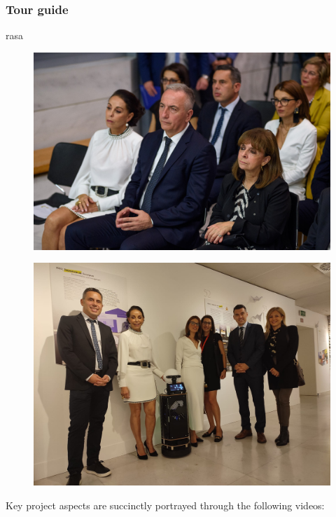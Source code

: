 \subsubsection{Tour guide}
rasa





\begin{figure}[H]\centering
  \includegraphics[scale=0.35]{images/cultureid/omg1.jpg}
  \caption{\small }
  \label{fig:cultureid_omg1}
\end{figure}
\begin{figure}[H]\centering
  \includegraphics[scale=0.2]{images/cultureid/omg2.jpg}
  \caption{\small }
  \label{fig:cultureid_omg2}
\end{figure}

\noindent Key project aspects are succinctly portrayed through the following videos:

